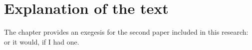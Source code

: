 \section{Explanation of the text}

The chapter provides an exegesis for the second paper included in this research: or it would, if I had one. 

